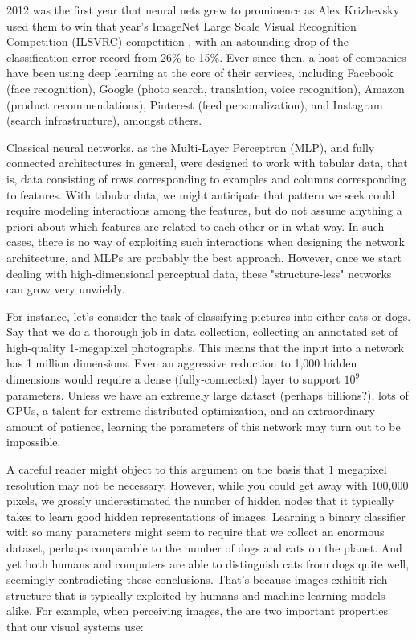 2012 was the first year that neural nets grew to prominence as Alex Krizhevsky used them to win that year’s ImageNet Large Scale Visual Recognition Competition (ILSVRC) competition \citep{Krizhevsky2012}, with an astounding drop of the classification error record from 26\% to 15\%. Ever since then, a host of companies have been using deep learning at the core of their services, including Facebook (face recognition), Google (photo search, translation, voice recognition), Amazon (product recommendations), Pinterest (feed personalization), and Instagram (search infrastructure), amongst others.

Classical neural networks, as the Multi-Layer Perceptron (MLP), and fully connected architectures in general, were designed to work with tabular data, that is, data consisting of rows corresponding to examples and columns corresponding to features. With tabular data, we might anticipate that pattern we seek could require modeling interactions among the features, but do not assume anything a priori about which features are related to each other or in what way. In such cases, there is no way of exploiting such interactions when designing the network architecture, and MLPs are probably the best approach. However, once we start dealing with high-dimensional perceptual data, these "structure-less" networks can grow very unwieldy. 

For instance, let’s consider the task of classifying pictures into either cats or dogs. Say that we do a thorough job in data collection, collecting an annotated set of high-quality 1-megapixel photographs. This means that the input into a network has 1 million dimensions. Even an aggressive reduction to 1,000 hidden dimensions would require a dense (fully-connected) layer to support  $10^9$  parameters. Unless we have an extremely large dataset (perhaps billions?), lots of GPUs, a talent for extreme distributed optimization, and an extraordinary amount of patience, learning the parameters of this network may turn out to be impossible.

A careful reader might object to this argument on the basis that 1 megapixel resolution may not be necessary. However, while you could get away with 100,000 pixels, we grossly underestimated the number of hidden nodes that it typically takes to learn good hidden representations of images. Learning a binary classifier with so many parameters might seem to require that we collect an enormous dataset, perhaps comparable to the number of dogs and cats on the planet. And yet both humans and computers are able to distinguish cats from dogs quite well, seemingly contradicting these conclusions. That’s because images exhibit rich structure that is typically exploited by humans and machine learning models alike. For example, when perceiving images, the are two important properties that our visual systems use:

